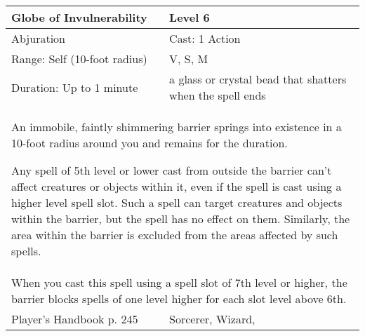 \documentclass[11pt]{report}
\begin{document}
\begin{table}[H]
	\begin{tabular}{||p{6cm}|p{6cm}||}
		\hline\hline
		\bf{Globe of Invulnerability} & Level 6\\ \hline
		Abjuration & Cast: 1 Action\\ \hline
		Range: Self (10-foot radius) & V, S, M\\ \hline
		Duration: Up to 1 minute & a glass or crystal bead that shatters when the spell ends\\ \hline
		\multicolumn{2}{||p{12cm}||}{An immobile, faintly shimmering barrier springs into existence in a 10-foot radius around you and remains for the duration.

Any spell of 5th level or lower cast from outside the barrier can’t affect creatures or objects within it, even if the spell is cast using a higher level spell slot. Such a spell can target creatures and objects within the barrier, but the spell has no effect on them. Similarly, the area within the barrier is excluded from the areas affected by such spells.}\\ \hline
		\multicolumn{2}{||p{12cm}||}{When you cast this spell using a spell slot of 7th level or higher, the barrier blocks spells of one level higher for each slot level above 6th.}\\ \hline
Player's Handbook p. 245 & Sorcerer, Wizard, \\ \hline\hline
	\end{tabular}
\end{table}
\end{document}
